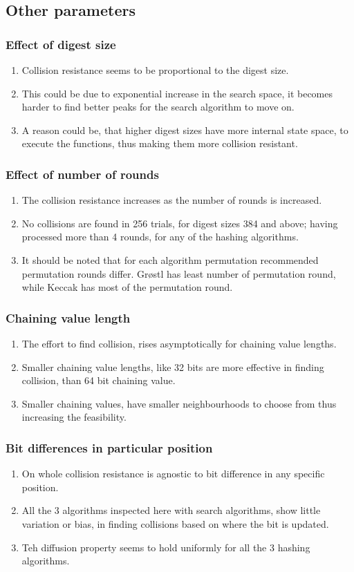 \documentclass{beamer}
\begin{document}
\subsection{Other parameters}

\begin{frame}
\frametitle{Effect of digest size}
\begin{enumerate}
\item Collision resistance seems to be proportional to the digest size.
\item This could be due to exponential increase in the search space, it becomes harder to find better peaks
for the search algorithm to move on.
\item A reason could be, that higher digest sizes have more internal state space, to execute the functions,
thus making them more collision resistant.
\end{enumerate}
\end{frame}

\begin{frame}
\frametitle{Effect of number of rounds}
\begin{enumerate}
\item The collision resistance increases as the number of rounds is increased.
\item No collisions are found in 256 trials, for digest sizes 384 and above; having processed more than 4
rounds, for any of the hashing algorithms.
\item It should be noted that for each algorithm permutation recommended permutation rounds differ. Gr{\o}stl
has least number of permutation round, while Keccak has most of the permutation round.
\end{enumerate}
\end{frame}

\begin{frame}
\frametitle{Chaining value length}
\begin{enumerate}
\item The effort to find collision, rises asymptotically for chaining value lengths.
\item Smaller chaining value lengths, like 32 bits are more effective in finding collision, than 64 bit
chaining value.
\item Smaller chaining values, have smaller neighbourhoods to choose from thus increasing the feasibility.
\end{enumerate}
\end{frame}

\begin{frame}
\frametitle{Bit differences in particular position}
\begin{enumerate}
\item On whole collision resistance is agnostic to bit difference in any specific position.
\item All the 3 algorithms inspected here with search algorithms, show little variation or bias, in finding
collisions based on where the bit is updated.
\item Teh diffusion property seems to hold uniformly for all the 3 hashing algorithms.
\end{enumerate}
\end{frame}
\end{document}
